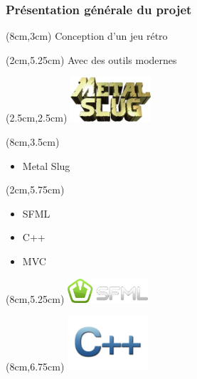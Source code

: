 \begin{frame}
	
	\frametitle{Présentation générale du projet}
	
	\begin{textblock*}{5cm}(8cm,3cm)
		Conception d'un jeu rétro
	\end{textblock*}
	
	\begin{textblock*}{5cm}(2cm,5.25cm)
		Avec des outils modernes
	\end{textblock*}
	
	{
		\begin{textblock*}{3cm}(2.5cm,2.5cm)
			\includegraphics[width=3cm]{figures/logo_metal_slug.png}
		\end{textblock*}
	
		\begin{textblock*}{5cm}(8cm,3.5cm)
			\begin{itemize}
				[triangle]
				\item Metal Slug
			\end{itemize}
		\end{textblock*}
	}
	
	{
		\begin{textblock*}{5cm}(2cm,5.75cm)
			\begin{itemize}
				\item SFML
			\end{itemize}
			\begin{itemize}
				\item C++
			\end{itemize}
			\begin{itemize}
				\item MVC
			\end{itemize}
		\end{textblock*}
	
		\begin{textblock*}{3cm}(8cm,5.25cm)
			\includegraphics[width=3cm]{figures/logo_sfml.png}
		\end{textblock*}
	
		\begin{textblock*}{3cm}(8cm,6.75cm)
			\includegraphics[width=3cm]{figures/logo_c++.png}
		\end{textblock*}
	}
	
\end{frame}
